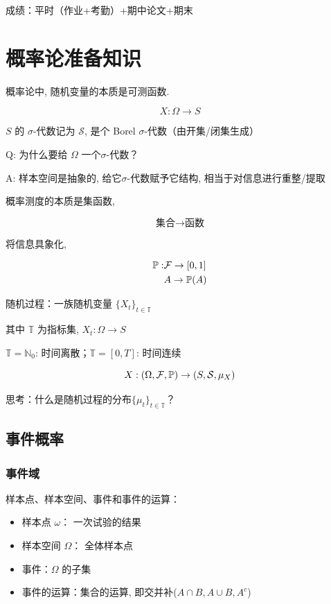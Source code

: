 成绩：平时（作业+考勤）+期中论文+期末

\section*{概率论准备知识}

概率论中, 随机变量的本质是可测函数. 

\[
X:\Omega\rightarrow S
\]

$S$ 的 $\sigma$-代数记为 $\mathcal{S}$, 是个 Borel $\sigma$-代数（由开集/闭集生成）

Q: 为什么要给 $\Omega$ 一个$\sigma$-代数？

A: 样本空间是抽象的, 给它$\sigma$-代数赋予它结构, 相当于对信息进行重整/提取

概率测度的本质是集函数, 

\[
\text{集合}\rightarrow \text{函数}
\]

将信息具象化, 

\[
\begin{aligned}
    \mathbb{P}: &\mathcal{F}\rightarrow [0,1]\\
    &A\rightarrow \mathbb{P}(A)
\end{aligned}
\]

随机过程：一族随机变量 $\{X_t\}_{t\in \mathbb{T}}$

其中 $\mathbb{T}$ 为指标集, $X_t:\Omega\rightarrow S$

\begin{example}
$\mathbb{T}=\mathbb{N}_0$: 时间离散；$\mathbb{T}=[0,T]$: 时间连续 
\end{example}

\[
X:(\Omega, \mathcal{F}, \mathbb{P})\rightarrow (S,\mathcal{S}, \mu_X)
\]

思考：什么是随机过程的分布$\{\mu_t\}_{t\in \mathbb{T}}$？

\newpage

\subsection{事件概率}

\subsubsection{事件域}

\begin{definition}[样本空间、事件]
    样本点、样本空间、事件和事件的运算：
    \begin{itemize}
        \item 样本点 $\omega$： 一次试验的结果
        \item 样本空间 $\Omega$： 全体样本点
        \item 事件：$\Omega$ 的子集
        \item 事件的运算：集合的运算, 即交并补($A\cap B, A\cup B, A^c$)
    \end{itemize}
\end{definition}

